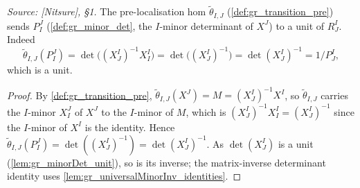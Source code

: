 \begin{lemma}\leanok
  \label{lem:gr_transition_pre_unit}
  \textit{Source: [Nitsure], \S 1.}
  The pre-localisation hom \(\tilde\theta_{I,J}\) (\cref{def:gr_transition_pre})
  sends \(P^J_I\) (\cref{def:gr_minor_det}, the \(I\)-minor determinant of
  \(X^J\)) to a unit of \(R^I_J\). Indeed
  \[
    \tilde\theta_{I,J}(P^J_I) = \det\bigl((X^I_J)^{-1} X^I_I\bigr)
      = \det\bigl((X^I_J)^{-1}\bigr) = \det(X^I_J)^{-1} = 1/P^I_J,
  \]
  which is a unit.
\end{lemma}
\begin{proof}
  \leanok
  By \cref{def:gr_transition_pre}, \(\tilde\theta_{I,J}(X^J) = M = (X^I_J)^{-1}
  X^I\), so \(\tilde\theta_{I,J}\) carries the \(I\)-minor \(X^J_I\) of \(X^J\) to
  the \(I\)-minor of \(M\), which is \((X^I_J)^{-1} X^I_I = (X^I_J)^{-1}\) since
  the \(I\)-minor of \(X^I\) is the identity. Hence \(\tilde\theta_{I,J}(P^J_I) =
  \det((X^I_J)^{-1}) = \det(X^I_J)^{-1}\). As \(\det(X^I_J)\) is a unit
  (\cref{lem:gr_minorDet_unit}), so is its inverse; the matrix-inverse
  determinant identity uses \cref{lem:gr_universalMinorInv_identities}.
\end{proof}

